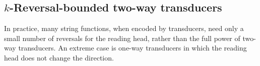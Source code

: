 




\subsection{$k$-Reversal-bounded two-way transducers} \label{subsec:krb}
 

In practice, many string functions, when encoded by transducers, need only a small number of reversals for the reading head, rather than the full power of two-way transducers. An extreme case is one-way transducers in which the reading head does not change the direction. 

